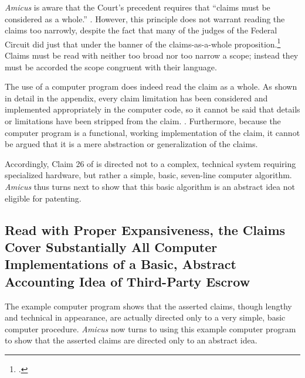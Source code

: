 \documentclass{scotus}
\def\numlines{seven\xspace}
\def\Amicus{\emph{Amicus}\xspace}
\begin{document}
\Amicus is aware that the Court's precedent requires that ``claims must be
considered as a whole.'' . However, this principle does
not warrant reading the claims too narrowly, despite the fact that many of the
judges of the Federal Circuit did just that under the banner of the
claims-as-a-whole proposition.\footnote{%
.} Claims must be read with neither too broad nor too narrow a
scope; instead they must be accorded the scope congruent with their language.

The use of a computer program does
indeed read the claim as a whole. As shown in detail in the appendix, every
claim limitation has been considered and implemented appropriately in the
computer code, so it cannot be said that details or limitations have been
stripped from the claim. . Furthermore,
because
the computer program is a functional, working implementation of the claim, it
cannot be argued that it is a mere abstraction or generalization of the claims.

Accordingly, Claim 26 of  is directed not to a complex, technical
system requiring specialized hardware, but rather a simple, basic,
\numlines-line computer algorithm. \Amicus thus turns next to show that this
basic algorithm is an abstract idea not eligible for patenting.

\subsection{Read with Proper Expansiveness, the Claims Cover Substantially All
Computer Implementations of a Basic, Abstract Accounting Idea of Third-Party
Escrow}

The example computer program shows that the asserted claims, though lengthy and
technical in appearance, are actually directed only to a very simple, basic
computer procedure. \Amicus now turns to using this example computer program to
show that the asserted claims are directed only to an abstract idea.
\end{document}
